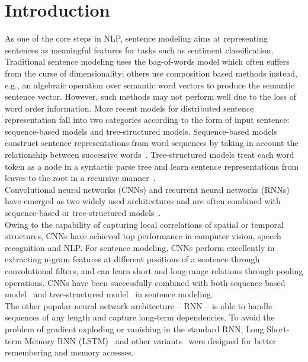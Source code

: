 \documentclass[11pt,letterpaper]{article}
\begin{document}
\section{Introduction}
As one of the core steps in NLP, sentence modeling aims at representing
sentences as meaningful features for %
tasks such as sentiment classification.
Traditional sentence modeling uses the bag-of-words model
which often suffers from the curse of dimensionality; others use composition
based methods instead, e.g., an algebraic operation over semantic word vectors
to produce the semantic sentence vector. However, such methods may not
perform well due to the loss of word order information.
More recent models for distributed sentence representation fall into two
categories according to the form of input sentence: sequence-based
models and tree-structured models.
Sequence-based models construct sentence representations from word
sequences by taking in account the relationship between successive
words~\cite{effective}.
Tree-structured models %
treat each word token as a node in a syntactic parse tree and learn sentence
representations from leaves to the root in a recursive
manner~\cite{socher2013}.\\
\indent Convolutional neural networks (CNNs) and recurrent neural
networks (RNNs) have emerged as two widely used architectures and are
often combined with sequence-based or tree-structured
models~\cite{tai2015,tao,tang,kim,dcnn,mou}.\\
\indent Owing to the capability of capturing local correlations of
spatial or temporal structures, CNNs have achieved top performance in
computer vision, speech recognition and NLP.
For sentence modeling, CNNs perform excellently in extracting n-gram
features at different positions of a sentence through convolutional
filters, and can learn short and long-range relations through pooling
operations.
CNNs have been successfully combined with both sequence-based
model~\cite{modelling,dcnn} and tree-structured model~\cite{mou} in
sentence modeling.\\
\indent The other popular neural network architecture -- RNN -- is able
to handle sequences of any length and capture long-term dependencies.
To avoid the problem of gradient exploding or vanishing in the standard
RNN, Long Short-term Memory RNN (LSTM)~\cite{lstm} and other
variants~\cite{gru} were designed for better remembering and
memory accesses.
\end{document}
